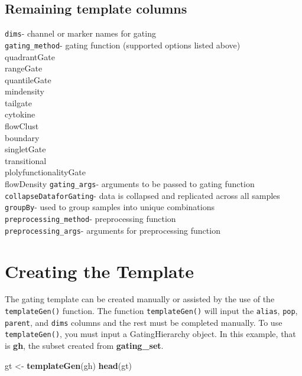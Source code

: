 \documentclass[]{book}
\newenvironment{Shaded}{\begin{snugshade}}{\end{snugshade}}
\newcommand{\KeywordTok}[1]{\textcolor[rgb]{0.13,0.29,0.53}{\textbf{#1}}}
\newcommand{\NormalTok}[1]{#1}
\newcommand{\StringTok}[1]{\textcolor[rgb]{0.31,0.60,0.02}{#1}}
\begin{document}
\hypertarget{remaining-template-columns}{%
\subsection{Remaining template columns}\label{remaining-template-columns}}

\texttt{dims}- channel or marker names for gating\\
\texttt{gating\_method}- gating function (supported options listed above)\\
quadrantGate\\
rangeGate\\
quantileGate\\
mindensity\\
tailgate\\
cytokine\\
flowClust\\
boundary\\
singletGate\\
transitional\\
plolyfunctionalityGate\\
flowDensity
\texttt{gating\_args}- arguments to be passed to gating function
\texttt{collapseDataforGating}- data is collapsed and replicated across all samples\\
\texttt{groupBy}- used to group samples into unique combinations\\
\texttt{preprocessing\_method}- preprocessing function\\
\texttt{preprocessing\_args}- arguments for preprocessing function

\hypertarget{creating-the-template}{%
\section{Creating the Template}\label{creating-the-template}}

The gating template can be created manually or assisted by the use of the \texttt{templateGen()} function. The function \texttt{templateGen()} will input the \texttt{alias}, \texttt{pop}, \texttt{parent}, and \texttt{dims} columns and the rest must be completed manually. To use \texttt{templateGen()}, you must input a GatingHierarchy object. In this example, that is \textbf{gh}, the subset created from \textbf{gating\_set}.

\begin{Shaded}
\begin{Highlighting}[]
\NormalTok{gt <-}\StringTok{ }\KeywordTok{templateGen}\NormalTok{(gh)}
\KeywordTok{head}\NormalTok{(gt)}
\end{Highlighting}
\end{Shaded}
\end{document}
